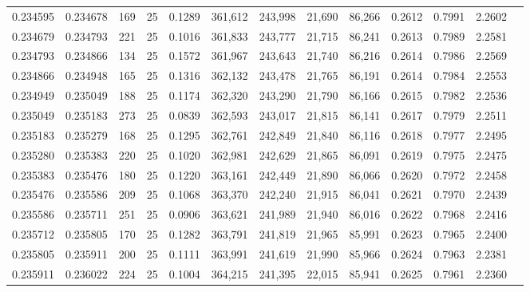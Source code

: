 \begin{tabular}{rrrrrrrrrrrrr}
0.234595 & 0.234678 &   169 &  25 &                                     0.1289 & 361,612 & 243,998 &  21,690 &  86,266 & 0.2612 & 0.7991 & 2.2602 \\
0.234679 & 0.234793 &   221 &  25 &                                     0.1016 & 361,833 & 243,777 &  21,715 &  86,241 & 0.2613 & 0.7989 & 2.2581 \\
0.234793 & 0.234866 &   134 &  25 &                                     0.1572 & 361,967 & 243,643 &  21,740 &  86,216 & 0.2614 & 0.7986 & 2.2569 \\
0.234866 & 0.234948 &   165 &  25 &                                     0.1316 & 362,132 & 243,478 &  21,765 &  86,191 & 0.2614 & 0.7984 & 2.2553 \\
0.234949 & 0.235049 &   188 &  25 &                                     0.1174 & 362,320 & 243,290 &  21,790 &  86,166 & 0.2615 & 0.7982 & 2.2536 \\
0.235049 & 0.235183 &   273 &  25 &                                     0.0839 & 362,593 & 243,017 &  21,815 &  86,141 & 0.2617 & 0.7979 & 2.2511 \\
0.235183 & 0.235279 &   168 &  25 &                                     0.1295 & 362,761 & 242,849 &  21,840 &  86,116 & 0.2618 & 0.7977 & 2.2495 \\
0.235280 & 0.235383 &   220 &  25 &                                     0.1020 & 362,981 & 242,629 &  21,865 &  86,091 & 0.2619 & 0.7975 & 2.2475 \\
0.235383 & 0.235476 &   180 &  25 &                                     0.1220 & 363,161 & 242,449 &  21,890 &  86,066 & 0.2620 & 0.7972 & 2.2458 \\
0.235476 & 0.235586 &   209 &  25 &                                     0.1068 & 363,370 & 242,240 &  21,915 &  86,041 & 0.2621 & 0.7970 & 2.2439 \\
0.235586 & 0.235711 &   251 &  25 &                                     0.0906 & 363,621 & 241,989 &  21,940 &  86,016 & 0.2622 & 0.7968 & 2.2416 \\
0.235712 & 0.235805 &   170 &  25 &                                     0.1282 & 363,791 & 241,819 &  21,965 &  85,991 & 0.2623 & 0.7965 & 2.2400 \\
0.235805 & 0.235911 &   200 &  25 &                                     0.1111 & 363,991 & 241,619 &  21,990 &  85,966 & 0.2624 & 0.7963 & 2.2381 \\
0.235911 & 0.236022 &   224 &  25 &                                     0.1004 & 364,215 & 241,395 &  22,015 &  85,941 & 0.2625 & 0.7961 & 2.2360 \\

\end{tabular}
